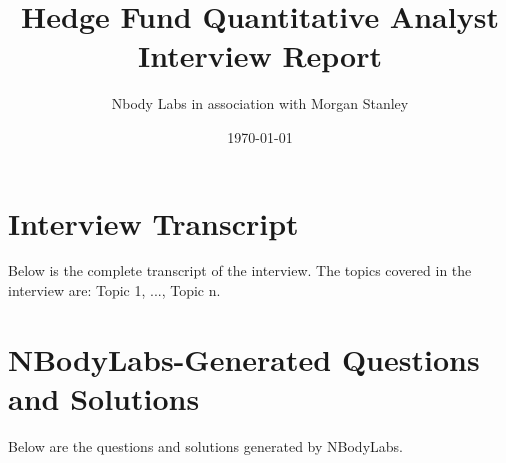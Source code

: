 \documentclass{article}%
\title{Hedge Fund Quantitative Analyst Interview Report}%
\author{Nbody Labs in association with Morgan Stanley}%
\date{\today}%
\begin{document}
%
\normalsize%
\maketitle%
\section{Interview Transcript}%
\label{sec:InterviewTranscript}%
Below is the complete transcript of the interview.%
The topics covered in the interview are: Topic 1, ..., Topic n.

%
\section{NBodyLabs{-}Generated Questions and Solutions}%
\label{sec:NBodyLabs{-}GeneratedQuestionsandSolutions}%
Below are the questions and solutions generated by NBodyLabs.%
\end{document}
